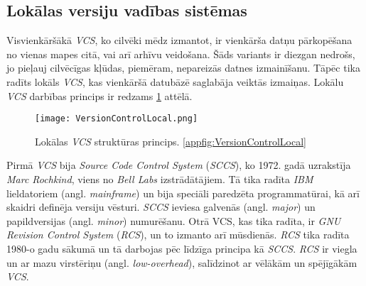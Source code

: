 \subsection{Lokālas versiju vadības sistēmas}
Visvienkāršākā \textit{VCS}, ko cilvēki mēdz izmantot, ir vienkārša datņu pārkopēšana no vienas mapes citā, vai arī arhīvu veidošana. Šāds variants ir diezgan nedrošs, jo pieļauj cilvēcīgas kļūdas, piemēram, nepareizās datnes izmainīšanu. Tāpēc tika radīts lokāls \textit{VCS}, kas vienkāršā datubāzē saglabāja veiktās izmaiņas. Lokālu \textit{VCS} darbības princips ir redzams \ref{fig:VersionControlLocal} attēlā.
\begin{figure}[H]%
	\centering
	\captionsetup{justification=centering}
	\texttt{[image: VersionControlLocal.png]}
	\caption{Lokālas \textit{VCS} struktūras princips. \ref{appfig:VersionControlLocal}}
	\label{fig:VersionControlLocal}
\end{figure}
Pirmā \textit{VCS} bija \textit{Source Code Control System} (\textit{SCCS}), ko 1972. gadā uzrakstīja \textit{Marc Rochkind}, viens no \textit{Bell Labs} izstrādātājiem. Tā tika radīta \textit{IBM} lieldatoriem (angl. \textit{mainframe}) un bija speciāli paredzēta programmatūrai, kā arī skaidri definēja versiju vēsturi. \textit{SCCS} ieviesa galvenās (angl. \textit{major}) un papildversijas (angl. \textit{minor}) numurēšanu.
Otrā VCS, kas tika radīta, ir \textit{GNU Revision Control System} (\textit{RCS}), un to izmanto arī mūsdienās. \textit{RCS} tika radīta 1980-o gadu sākumā un tā darbojas pēc līdzīga principa kā \textit{SCCS}. \textit{RCS} ir viegla un ar mazu virstēriņu (angl. \textit{low-overhead}), salīdzinot ar vēlākām un spējīgākām \textit{VCS}. \cite{chacon2014progit}

